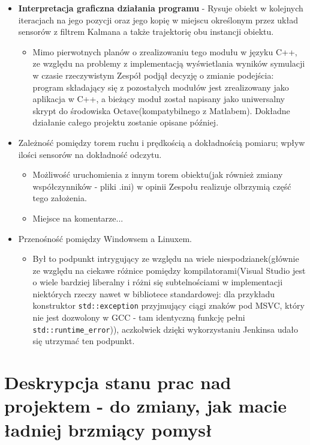 \documentclass{article}
\begin{document}
\begin{itemize}
		\item \textbf{Interpretacja graficzna działania programu} - Rysuje obiekt w kolejnych iteracjach na jego pozycji oraz jego kopię w miejscu określonym przez układ sensorów z filtrem Kalmana a także trajektorię obu instancji obiektu.
			\begin{itemize}
				\item Mimo pierwotnych planów o zrealizowaniu tego modułu w języku C++, ze względu na problemy z implementacją wyświetlania wyników symulacji w czasie rzeczywistym Zespół podjął decyzję o zmianie podejścia: program składający się z pozostałych modułów jest zrealizowany jako aplikacja w C++, a bieżący moduł został napisany jako uniwersalny skrypt do środowiska Octave(kompatybilnego z Matlabem). Dokładne działanie całego projektu zostanie opisane później.
			\end{itemize}
			
		\item Zależność pomiędzy torem ruchu i prędkością a dokładnością pomiaru; wpływ ilości sensorów na dokładność odczytu. 
			\begin{itemize}
				\item Możliwość uruchomienia z innym torem obiektu(jak również zmiany współczynników - pliki .ini) w opinii Zespołu realizuje olbrzymią część tego założenia.
				\item Miejsce na komentarze... 
			\end{itemize}
		\item Przenośność pomiędzy Windowsem a Linuxem.
			\begin{itemize}
				\item Był to podpunkt intrygujący ze względu na wiele niespodzianek(głównie ze względu na ciekawe różnice pomiędzy kompilatorami(Visual Studio jest o wiele bardziej liberalny i różni się subtelnościami w implementacji niektórych rzeczy nawet w bibliotece standardowej: dla przykładu konstruktor \texttt{std::exception} przyjmujący ciągi znaków pod MSVC, który nie jest dozwolony w GCC - tam identyczną funkcję pełni \texttt{std::runtime\_error})), aczkolwiek dzięki wykorzystaniu Jenkinsa udało się utrzymać ten podpunkt. 
			\end{itemize}
				
		\end{itemize}		
	
	\section{Deskrypcja stanu prac nad projektem - do zmiany, jak macie ładniej brzmiący pomysł}
	
\end{document}
